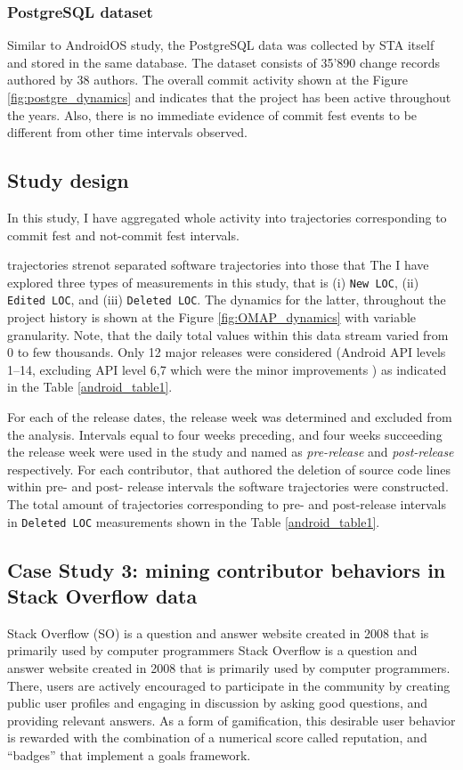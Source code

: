 \subsubsection{PostgreSQL dataset}
Similar to AndroidOS study, the PostgreSQL data was collected by STA itself and stored in the same database. The dataset consists of 35'890 change records authored by 38 authors. The overall commit activity shown at the Figure \ref{fig:postgre_dynamics} and indicates that the project has been active throughout the years. Also, there is no immediate evidence of commit fest events to be different from other time intervals observed.

\subsection{Study design}
In this study, I have aggregated whole activity into trajectories corresponding to commit fest and not-commit fest intervals.

trajectories strenot separated software trajectories into those that The I have explored three types of measurements in this study, that is (i) \texttt{New LOC}, (ii) \texttt{Edited LOC}, and (iii) \texttt{Deleted LOC}. The dynamics for the latter, throughout the project history is shown at the Figure \ref{fig:OMAP_dynamics} with variable granularity. Note, that the daily total values within this data stream varied from 0 to few thousands. Only 12 major releases were considered (Android API levels 1--14, excluding API level 6,7 which were the minor improvements \cite{api-levels}) as indicated in the Table \ref{android_table1}. 

For each of the release dates, the release week was determined and excluded from the analysis. Intervals equal to four weeks preceding, and four weeks succeeding the release week were used in the study and named as \textit{pre-release} and \textit{post-release} respectively. For each contributor, that authored the deletion of source code lines within pre- and post- release intervals the software trajectories were constructed. The total amount of trajectories corresponding to pre- and post-release intervals in \texttt{Deleted LOC} measurements shown in the Table \ref{android_table1}. 


\subsection{Case Study 3: mining contributor behaviors in Stack Overflow data}
Stack Overflow (SO) is a question and answer website created in 2008 that is primarily used by computer programmers Stack Overflow is a question and answer website created 
in 2008 that is primarily used by computer programmers. There, users are actively encouraged to participate in the community by creating public user profiles and engaging in discussion by asking good questions, and providing relevant answers. As a form of gamification, this desirable user behavior is rewarded with the combination of a numerical score called reputation, and ``badges'' that implement a goals framework. 

